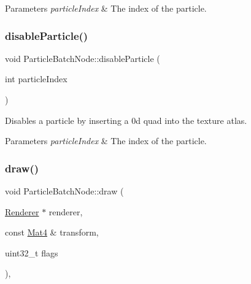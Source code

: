 \begin{DoxyParams}{Parameters}
{\em particle\+Index} & The index of the particle. \\
\hline
\end{DoxyParams}
\mbox{\label{classParticleBatchNode_a8041807df39f5cdfa35b5423bb5c4a17}} 
\subsubsection{\texorpdfstring{disable\+Particle()}{disableParticle()}\hspace{0.1cm}{\footnotesize\ttfamily [2/2]}}
{\footnotesize\ttfamily void Particle\+Batch\+Node\+::disable\+Particle (\begin{DoxyParamCaption}\item[{int}]{particle\+Index }\end{DoxyParamCaption})}

Disables a particle by inserting a 0\textquotesingle{}d quad into the texture atlas.


\begin{DoxyParams}{Parameters}
{\em particle\+Index} & The index of the particle. \\
\hline
\end{DoxyParams}
\mbox{\label{classParticleBatchNode_a05ece10bbbbb5566e28ba1365498eb91}} 
\subsubsection{\texorpdfstring{draw()}{draw()}\hspace{0.1cm}{\footnotesize\ttfamily [1/2]}}
{\footnotesize\ttfamily void Particle\+Batch\+Node\+::draw (\begin{DoxyParamCaption}\item[{\hyperlink{classRenderer}{Renderer} $\ast$}]{renderer,  }\item[{const \hyperlink{classMat4}{Mat4} \&}]{transform,  }\item[{uint32\+\_\+t}]{flags }\end{DoxyParamCaption})\hspace{0.3cm}{\ttfamily [override]}, {\ttfamily [virtual]}}

